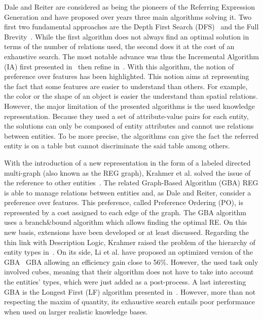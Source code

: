 Dale and Reiter are considered as being the pioneers of the Referring Expression Generation and have proposed over years three main algorithms solving it. Two first two fundamental approaches are the Depth First Search (DFS)~\cite{dale_1989_cooking} and the Full Brevity~\cite{dale_1992_generating}. While the first algorithm does not always find an optimal solution in terms of the number of relations used, the second does it at the cost of an exhaustive search. The most notable advance was thus the Incremental Algorithm (IA) first presented in~\cite{reiter_1992_fast} then refine in~\cite{dale_1995_computational}. With this algorithm, the notion of preference over features has been highlighted. This notion aims at representing the fact that some features are easier to understand than others. For example, the color or the shape of an object is easier the understand than spatial relations. However, the major limitation of the presented algorithms is the used knowledge representation. Because they used a set of attribute-value pairs for each entity, the solutions can only be composed of entity attributes and cannot use relations between entities. To be more precise, the algorithms can give the fact the referred entity is on a table but cannot discriminate the said table among others.

With the introduction of a new representation in the form of a labeled directed multi-graph (also known as the REG graph), Krahmer et al. solved the issue of the reference to other entities~\cite{krahmer_2003_graph}. The related Graph-Based Algorithm (GBA) REG is able to manage relations between entities and, as Dale and Reiter, consider a preference over features. This preference, called Preference Ordering (PO), is represented by a cost assigned to each edge of the graph. The GBA algorithm uses a branch\&bound algorithm which allows finding the optimal RE. On this new basis, extensions have been developed or at least discussed. Regarding the thin link with Description Logic, Krahmer raised the problem of the hierarchy of entity types in~\cite{krahmer_2012_computational}. On its side, Li et al. have proposed an optimized version of the GBA~\cite{li_2017_automatically} GBA allowing an efficiency gain close to 56\%. However, the used task only involved cubes, meaning that their algorithm does not have to take into account the entities' types, which were just added as a post-process. A last interesting GBA is the Longest First (LF) algorithm presented in~\cite{viethen_2013_graphs}. However, more than not respecting the maxim of quantity, its exhaustive search entails poor performance when used on larger realistic knowledge bases.

